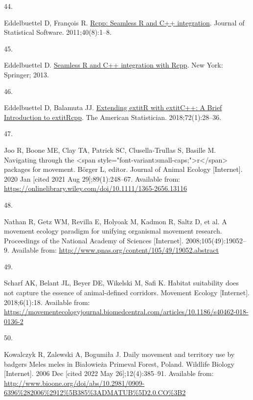\documentclass[10pt,a4paper]{article}
\newlength{\cslhangindent}
\newlength{\csllabelwidth}
\newlength{\cslentryspacingunit} %
\newenvironment{CSLReferences}[2] %
 {%
  \setlength{\parindent}{0pt}
  \ifodd #1
  \let\oldpar\par
  \def\par{\hangindent=\cslhangindent\oldpar}
  \fi
  \setlength{\parskip}{#2\cslentryspacingunit}
 }%
 {}
\newcommand{\CSLLeftMargin}[1]{\parbox[t]{\csllabelwidth}{#1}}
\newcommand{\CSLRightInline}[1]{\parbox[t]{\linewidth - \csllabelwidth}{#1}\break}
\begin{document}
\begin{CSLReferences}{0}{0}
\leavevmode{}%
\CSLLeftMargin{44. }
\CSLRightInline{Eddelbuettel D, François R. \href{https://doi.org/10.18637/jss.v040.i08}{{Rcpp}: Seamless {R} and {C++} integration}. Journal of Statistical Software. 2011;40(8):1--8. }

\leavevmode{}%
\CSLLeftMargin{45. }
\CSLRightInline{Eddelbuettel D. \href{https://doi.org/10.1007/978-1-4614-6868-4}{Seamless {R} and {C++} integration with {Rcpp}}. New York: Springer; 2013. }

\leavevmode{}%
\CSLLeftMargin{46. }
\CSLRightInline{Eddelbuettel D, Balamuta JJ. \href{https://doi.org/10.1080/00031305.2017.1375990}{{Extending extit{R} with extit{C++}: A Brief Introduction to extit{Rcpp}}}. The American Statistician. 2018;72(1):28--36. }

\leavevmode{}%
\CSLLeftMargin{47. }
\CSLRightInline{Joo R, Boone ME, Clay TA, Patrick SC, Clusella‐Trullas S, Basille M. Navigating through the {\textless{}}span style="font-variant:small-caps;"{\textgreater{}}r{\textless{}}/span{\textgreater{}} packages for movement. Börger L, editor. Journal of Animal Ecology {[}Internet{]}. 2020 Jan {[}cited 2021 Aug 29{]};89(1):248--67. Available from: \url{https://onlinelibrary.wiley.com/doi/10.1111/1365-2656.13116}}

\leavevmode{}%
\CSLLeftMargin{48. }
\CSLRightInline{Nathan R, Getz WM, Revilla E, Holyoak M, Kadmon R, Saltz D, et al. A movement ecology paradigm for unifying organismal movement research. Proceedings of the National Academy of Sciences {[}Internet{]}. 2008;105(49):19052--9. Available from: \url{http://www.pnas.org/content/105/49/19052.abstract}}

\leavevmode{}%
\CSLLeftMargin{49. }
\CSLRightInline{Scharf AK, Belant JL, Beyer DE, Wikelski M, Safi K. Habitat suitability does not capture the essence of animal-defined corridors. Movement Ecology {[}Internet{]}. 2018;6(1):18. Available from: \url{https://movementecologyjournal.biomedcentral.com/articles/10.1186/s40462-018-0136-2}}

\leavevmode{}%
\CSLLeftMargin{50. }
\CSLRightInline{Kowalczyk R, Zalewski A, Bogumiła J. Daily movement and territory use by badgers {Meles} meles in {Białowieża} {Primeval} {Forest}, {Poland}. Wildlife Biology {[}Internet{]}. 2006 Dec {[}cited 2022 May 26{]};12(4):385--91. Available from: \url{http://www.bioone.org/doi/abs/10.2981/0909-6396\%282006\%2912\%5B385\%3ADMATUB\%5D2.0.CO\%3B2}}


\end{CSLReferences}
\end{document}
